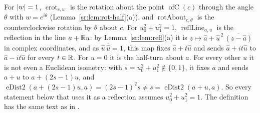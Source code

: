 For $\lvert w\rvert=1$, $\operatorname{crot}_{c,w}$ is the rotation about the point $\operatorname{ofC}(c)$ through the angle
$\theta$ with $w=e^{i\theta}$ (Lemma~\ref{sr:lem:rot-half}(a)), and $\operatorname{rotAbout}_{c,\theta}$ is the
counterclockwise rotation by $\theta$ about $c$. For $u_0^2+u_1^2=1$, $\operatorname{reflLine}_{a,u}$ is the reflection
in the line $a+\mathbb R u$: by Lemma~\ref{sr:lem:refl}(a) it is $z\mapsto\hat a+\hat u^{\,2}\,\overline{(z-\hat a)}$ in
complex coordinates, and as $\hat u\,\overline{\hat u}=1$, this map fixes $\hat a+t\hat u$ and sends $\hat a+it\hat u$
to $\hat a-it\hat u$ for every $t\in\mathbb R$. For $u=0$ it is the half-turn about $a$. For every other $u$ it is not even a
Euclidean isometry: with $s=u_0^2+u_1^2\notin\{0,1\}$, it fixes $a$ and sends $a+u$ to $a+(2s-1)u$, and
$\operatorname{eDist2}(a+(2s-1)u,a)=(2s-1)^2s\ne s=\operatorname{eDist2}(a+u,a)$. So every statement below that uses
it as a reflection assumes $u_0^2+u_1^2=1$. The definition has the same text as  in
.

